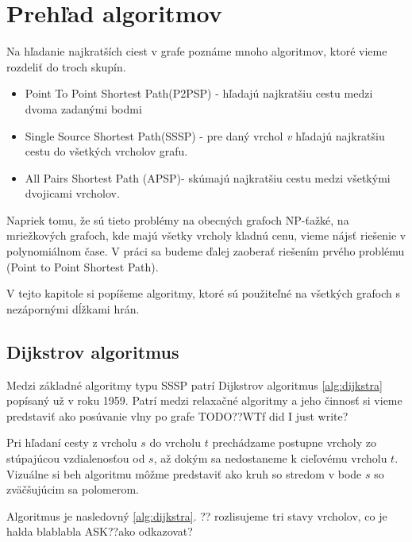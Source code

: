 \chapter{Prehľad algoritmov}
Na hľadanie najkratších ciest v grafe poznáme mnoho algoritmov, ktoré vieme rozdeliť do troch skupín.


\begin{itemize}
\item Point To Point Shortest Path(P2PSP) - hľadajú najkratšiu cestu medzi dvoma zadanými bodmi
\item Single Source Shortest Path(SSSP) - pre daný vrchol {\sl v} hľadajú najkratšiu cestu do všetkých vrcholov grafu.
\item All Pairs Shortest Path (APSP)- skúmajú najkratšiu cestu medzi všetkými dvojicami vrcholov.
\end{itemize}

Napriek tomu, že sú tieto problémy na obecných grafoch NP-ťažké, na mriežkových grafoch, kde majú všetky vrcholy kladnú cenu, vieme nájsť riešenie v polynomiálnom čase.
V práci sa budeme ďalej zaoberať riešením prvého problému (Point to Point Shortest Path). 

V tejto kapitole si popíšeme algoritmy, ktoré sú použiteľné na všetkých grafoch 
s nezápornými dĺžkami hrán.

\section{Dijkstrov algoritmus}
Medzi základné algoritmy typu SSSP patrí Dijkstrov algoritmus \ref{alg:dijkstra} popísaný už v roku 1959.
Patrí medzi relaxačné algoritmy a jeho činnosť si vieme predstaviť ako posúvanie vlny po grafe TODO??WTf did I just write?


Pri hľadaní cesty z vrcholu $s$ do vrcholu $t$ prechádzame postupne vrcholy zo stúpajúcou vzdialenosťou od $s$, až dokým sa nedostaneme k cieľovému vrcholu $t$.
Vizuálne si beh algoritmu môžme predstaviť ako kruh so stredom v bode $s$ so zväčšujúcim sa polomerom.

Algoritmus je nasledovný \ref{alg:dijkstra}. 
?? rozlisujeme tri stavy vrcholov, co je halda blablabla
ASK??ako odkazovat?

